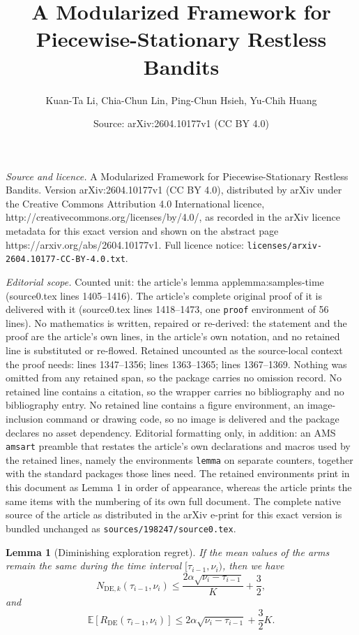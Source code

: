 \documentclass[10pt,a4paper]{amsart}
\title{A Modularized Framework for Piecewise-Stationary Restless Bandits}
\author{Kuan-Ta Li, Chia-Chun Lin, Ping-Chun Hsieh, Yu-Chih Huang}
\date{Source: arXiv:2604.10177v1 (CC BY 4.0)}
\newtheorem{lemma}{Lemma}
\newcommand{\E}{\mathbb{E}}
\begin{document}
\maketitle

\noindent\emph{Source and licence.} A Modularized Framework for Piecewise-Stationary Restless Bandits. Version arXiv:2604.10177v1 (CC BY 4.0), distributed by arXiv under the Creative Commons Attribution 4.0 International licence, http://creativecommons.org/licenses/by/4.0/, as recorded in the arXiv licence metadata for this exact version and shown on the abstract page https://arxiv.org/abs/2604.10177v1. Full licence notice: \texttt{licenses/arxiv-2604.10177-CC-BY-4.0.txt}.\par\smallskip

\noindent\textit{Editorial scope.} Counted unit: the article's lemma applemma:samples-time (source0.tex lines 1405--1416). The article's complete original proof of it is delivered with it (source0.tex lines 1418--1473, one \texttt{proof} environment of 56 lines). No mathematics is written, repaired or re-derived: the statement and the proof are the article's own lines, in the article's own notation, and no retained line is substituted or re-flowed.  Retained uncounted as the source-local context the proof needs: lines 1347--1356; lines 1363--1365; lines 1367--1369.  Nothing was omitted from any retained span, so the package carries no omission record.  No retained line contains a citation, so the wrapper carries no bibliography and no bibliography entry.  No retained line contains a figure environment, an image-inclusion command or drawing code, so no image is delivered and the package declares no asset dependency.  Editorial formatting only, in addition: an AMS \texttt{amsart} preamble that restates the article's own declarations and macros used by the retained lines, namely the environments \texttt{lemma} on separate counters, together with the standard packages those lines need.  The retained environments print in this document as Lemma 1 in order of appearance, whereas the article prints the same items with the numbering of its own full document.  The complete native source of the article as distributed in the arXiv e-print for this exact version is bundled unchanged as \texttt{sources/198247/source0.tex}.
\begin{lemma}[Diminishing exploration regret]\label{applemma:de_regret}
    If the mean values of the arms remain the same during the time interval $[\tau_{i-1}, \nu_{i})$, then we have
    \begin{equation}
        N_{\mathrm{DE},k}\left(\tau_{i-1}, \nu_{i}\right)\leq \frac{2\alpha\sqrt{\nu_{i}-\tau_{i-1}}}{K}+\frac{3}{2},
    \end{equation}
    and
    \begin{equation}
        \E\left[R_{\mathrm{DE}}\left(\tau_{i-1}, \nu_{i}\right)\right]\leq 2\alpha\sqrt{\nu_{i}-\tau_{i-1}}+\frac{3}{2}K.
    \end{equation}
\end{lemma}
\end{document}
